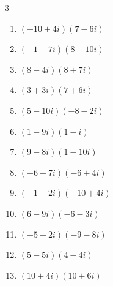\begin{multicols}{3}
\begin{enumerate}
  \item $\displaystyle (-10+4i)(7-6i)$

        \phantom{$\displaystyle =-46+88i$}

  \item $\displaystyle (-1+7i)(8-10i)$

        \phantom{$\displaystyle =62+66i$}

  \item $\displaystyle (8-4i)(8+7i)$

        \phantom{$\displaystyle =92+24i$}

  \item $\displaystyle (3+3i)(7+6i)$

        \phantom{$\displaystyle =3+39i$}

  \item $\displaystyle (5-10i)(-8-2i)$

        \phantom{$\displaystyle =-60+70i$}

\columnbreak %

  \item $\displaystyle (1-9i)(1-i)$

        \phantom{$\displaystyle =-8-10i$}

  \item $\displaystyle (9-8i)(1-10i)$

        \phantom{$\displaystyle =-71-98i$}

  \item $\displaystyle (-6-7i)(-6+4i)$

        \phantom{$\displaystyle =64+18i$}

  \item $\displaystyle (-1+2i)(-10+4i)$

        \phantom{$\displaystyle =2-24i$}

  \item $\displaystyle (6-9i)(-6-3i)$

        \phantom{$\displaystyle =-63+36i$}

  \item $\displaystyle (-5-2i)(-9-8i)$

        \phantom{$\displaystyle =29+58i$}

  \item $\displaystyle (5-5i)(4-4i)$

        \phantom{$\displaystyle =-40i$}

  \item $\displaystyle (10+4i)(10+6i)$


\end{enumerate}
\end{multicols}
